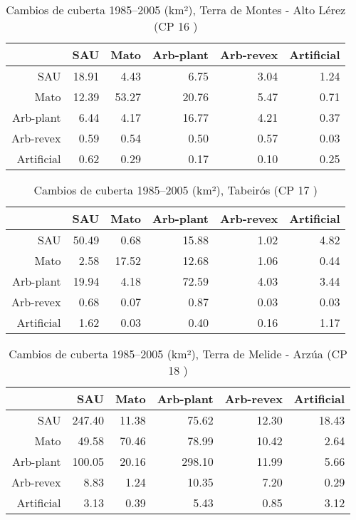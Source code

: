 \begin{table}[p]
\centering
\caption{Cambios de cuberta 1985--2005 (km²), Terra de Montes - Alto Lérez (CP 16 )} 
\label{TaboaContinxCP16}
\begin{tabular}{rrrrrr}
  \hline
 & SAU & Mato & Arb-plant & Arb-revex & Artificial \\ 
  \hline
SAU & 18.91 & 4.43 & 6.75 & 3.04 & 1.24 \\ 
  Mato & 12.39 & 53.27 & 20.76 & 5.47 & 0.71 \\ 
  Arb-plant & 6.44 & 4.17 & 16.77 & 4.21 & 0.37 \\ 
  Arb-revex & 0.59 & 0.54 & 0.50 & 0.57 & 0.03 \\ 
  Artificial & 0.62 & 0.29 & 0.17 & 0.10 & 0.25 \\ 
   \hline
\end{tabular}
\end{table}
\begin{table}[p]
\centering
\caption{Cambios de cuberta 1985--2005 (km²), Tabeirós (CP 17 )} 
\label{TaboaContinxCP17}
\begin{tabular}{rrrrrr}
  \hline
 & SAU & Mato & Arb-plant & Arb-revex & Artificial \\ 
  \hline
SAU & 50.49 & 0.68 & 15.88 & 1.02 & 4.82 \\ 
  Mato & 2.58 & 17.52 & 12.68 & 1.06 & 0.44 \\ 
  Arb-plant & 19.94 & 4.18 & 72.59 & 4.03 & 3.44 \\ 
  Arb-revex & 0.68 & 0.07 & 0.87 & 0.03 & 0.03 \\ 
  Artificial & 1.62 & 0.03 & 0.40 & 0.16 & 1.17 \\ 
   \hline
\end{tabular}
\end{table}
\begin{table}[p]
\centering
\caption{Cambios de cuberta 1985--2005 (km²), Terra de Melide - Arzúa (CP 18 )} 
\label{TaboaContinxCP18}
\begin{tabular}{rrrrrr}
  \hline
 & SAU & Mato & Arb-plant & Arb-revex & Artificial \\ 
  \hline
SAU & 247.40 & 11.38 & 75.62 & 12.30 & 18.43 \\ 
  Mato & 49.58 & 70.46 & 78.99 & 10.42 & 2.64 \\ 
  Arb-plant & 100.05 & 20.16 & 298.10 & 11.99 & 5.66 \\ 
  Arb-revex & 8.83 & 1.24 & 10.35 & 7.20 & 0.29 \\ 
  Artificial & 3.13 & 0.39 & 5.43 & 0.85 & 3.12 \\ 
   \hline
\end{tabular}
\end{table}
